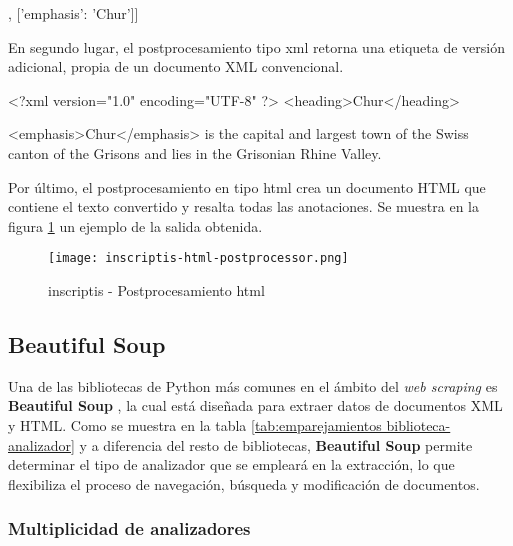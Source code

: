 \begin{Schunk}
  \begin{Soutput}
    [['heading', 'Chur'],
      ['emphasis': 'Chur']]
  \end{Soutput}
\end{Schunk}

En segundo lugar, el postprocesamiento tipo xml retorna una etiqueta de versión adicional, propia de un
documento XML convencional.

\begin{Schunk}
  \begin{Soutput}
    <?xml version="1.0" encoding="UTF-8" ?>
    <heading>Chur</heading>

    <emphasis>Chur</emphasis> is the capital and largest town of the 
    Swiss canton of the Grisons and lies in the Grisonian Rhine Valley.
  \end{Soutput}
\end{Schunk}

Por último, el postprocesamiento en tipo html crea un documento HTML que contiene el texto convertido y 
resalta todas las anotaciones. Se muestra en la figura \ref{img: inscriptis - postprocesamiento html} un 
ejemplo de la salida obtenida.

\begin{figure}[tphb]
  \centering
  \texttt{[image: inscriptis-html-postprocessor.png]}
  \caption{inscriptis - Postprocesamiento html}
  \label{img: inscriptis - postprocesamiento html}
\end{figure}

\subsection{Beautiful Soup}
\label{subsec:beautiful soup}

Una de las bibliotecas de Python más comunes en el ámbito del \emph{web scraping} es \textbf{Beautiful Soup}
\cite{beautifulsoup}, la cual está diseñada para extraer datos de documentos XML y HTML. Como se muestra
en la tabla \ref{tab:emparejamientos biblioteca-analizador} y a diferencia del resto de bibliotecas,
\textbf{Beautiful Soup} permite determinar el tipo de analizador que se empleará en la extracción, lo que
flexibiliza el proceso de navegación, búsqueda y modificación de documentos.

\subsubsection{Multiplicidad de analizadores}
\label{subsubsec:multiplicidad de analizadores}

